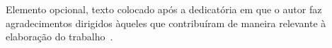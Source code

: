 \documentclass[
    12pt,				       %
    openright,			       %
    oneside,			       %
    a4paper,			       %
    chapter=TITLE,             %
    sumario=tradicional,       %
    english,			        %
    brazil, 				    %
 ]{abntex2}
\begin{document}
\frenchspacing


\pretextual


\imprimircapa

\imprimirfolhaderosto

\imprimirfolhadeaprovacao

\begin{dedicatoria}
    \vspace*{\fill}

    \begin{flushright}
        \begin{minipage}{0.5\textwidth} %
        \end{minipage}
    \end{flushright}

    \vspace*{2cm}
\end{dedicatoria}

\begin{agradecimentos}
    Elemento opcional, texto colocado ap\'os a dedicat\'oria em que o autor faz agradecimentos dirigidos àqueles que contribuíram de maneira relevante à elaboração do trabalho~\cite{NBR14724:2011}.
\end{agradecimentos}

\begin{epigrafe}
    \vspace*{\fill}

    \begin{flushright}
        \begin{minipage}{0.5\textwidth} %
        \end{minipage}
    \end{flushright}

    \vspace*{2cm}
\end{epigrafe}
\end{document}
